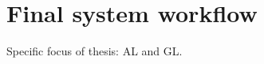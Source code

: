 \section{Final system workflow}
\label{sec:visualizer:summary}

Specific focus of thesis: AL and GL.